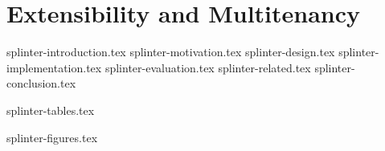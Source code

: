 \chapter{Extensibility and Multitenancy}

 {splinter-introduction.tex}
 {splinter-motivation.tex}
 {splinter-design.tex}
 {splinter-implementation.tex}
 {splinter-evaluation.tex}
 {splinter-related.tex}
 {splinter-conclusion.tex}

\clearpage

 {splinter-tables.tex}

\clearpage

 {splinter-figures.tex}
